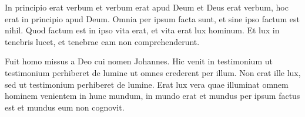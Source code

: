 \documentclass{scrbook}
\begin{document}
\beginnumbering
\pstart
In principio erat verbum et verbum erat apud Deum et Deus erat verbum, hoc erat in principio apud Deum.
 Omnia per ipsum facta sunt, et sine ipso factum est nihil.
 Quod factum est in ipso vita erat, et vita erat lux hominum.
 Et lux in tenebris lucet, et tenebrae eam non comprehenderunt.

 \pend
 \pstart
 Fuit homo missus a Deo cui nomen Johannes.
 Hic venit in testimonium ut testimonium perhiberet de lumine ut omnes crederent per illum.
 Non erat ille lux, sed ut testimonium perhiberet de lumine.
 Erat lux vera quae illuminat omnem hominem venientem in hunc mundum, in mundo erat et mundus per ipsum factus est et mundus eum non cognovit.

 \pend
 \endnumbering

 \printindex[verb]

 
\end{document}
